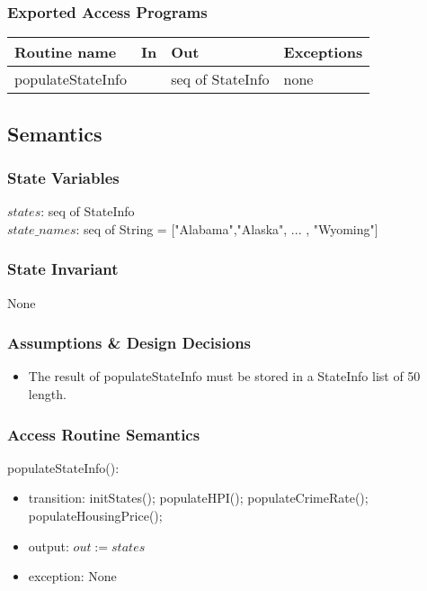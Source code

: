 \documentclass[12pt]{article}
\begin{document}
\subsubsection* {Exported Access Programs}

\begin{tabular}{| l | l | l | p{5cm} |}
\hline
\textbf{Routine name} & \textbf{In} & \textbf{Out} & \textbf{Exceptions}\\
\hline
populateStateInfo & & seq of StateInfo & none\\
\hline
\end{tabular}

\subsection* {Semantics}

\subsubsection* {State Variables}

$states$: seq of StateInfo\\
$state\_names$: seq of String = ["Alabama","Alaska", ... , "Wyoming"]

\subsubsection* {State Invariant}

None

\subsubsection* {Assumptions \& Design Decisions}

\begin{itemize}
\item The result of populateStateInfo must be stored in a StateInfo list of 50 length.
\end{itemize}

\subsubsection* {Access Routine Semantics}

\noindent populateStateInfo():
\begin{itemize}
\item transition: initStates(); populateHPI(); populateCrimeRate(); \\populateHousingPrice();
\item output: $\mathit{out} := states$
\item exception: None
\end{itemize}
\end{document}
